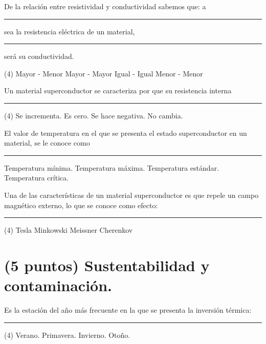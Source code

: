 \documentclass[12pt, letter]{exam}
\begin{document}
\begin{questions}
    \question De la relación entre resistividad y conductividad sabemos que: a \rule{2cm}{0.1mm} sea la resistencia eléctrica de un material, \rule{2cm}{0.1mm} será su conductividad.
    \begin{tasks}(4)
        \task Mayor - Menor
        \task Mayor - Mayor
        \task Igual - Igual
        \task Menor - Menor
    \end{tasks}
    \question Un material superconductor se caracteriza por que su resistencia interna \rule{2cm}{0.1mm}
    \begin{tasks}(4)
        \task Se incrementa.
        \task Es cero.
        \task Se hace negativa.
        \task No cambia.
    \end{tasks}
    \question El valor de temperatura en el que se presenta el estado superconductor en un material, se le conoce como \rule{2cm}{0.1mm}
    \begin{multicols}{2}
    \begin{tasks}
        \task Temperatura mínima.
        \task Temperatura máxima.
        \task Temperatura estándar.
        \task Temperatura crítica.
    \end{tasks}
    \end{multicols}
    \question Una de las características de un material superconductor es que repele un campo magnético externo, lo que se conoce como efecto: \rule{2cm}{0.1mm}
    \begin{tasks}(4)
        \task Tesla
        \task Minkowski
        \task Meissner
        \task Cherenkov
    \end{tasks}

    \section{(5 puntos) Sustentabilidad y contaminación.}

    \question Es la estación del año más frecuente en la que se presenta la inversión térmica: \rule{2cm}{0.1mm}
    \begin{tasks}(4)
        \task Verano.
        \task Primavera.
        \task Invierno.
        \task Otoño.
    \end{tasks}

    \newpage
    

\end{questions}
\end{document}
